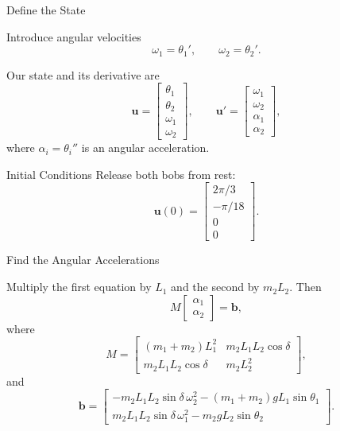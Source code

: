 \documentclass[10pt]{beamer}
\begin{document}
\begin{frame}{Define the State}

Introduce angular velocities
\[
\omega_1=\theta_1',
\qquad
\omega_2=\theta_2'.
\]

Our state and its derivative are
\[
\mathbf{u}=
\begin{bmatrix}
\theta_1\\
\theta_2\\
\omega_1\\
\omega_2
\end{bmatrix},
\qquad
\mathbf{u}'=
\begin{bmatrix}
\omega_1\\
\omega_2\\
\alpha_1\\
\alpha_2
\end{bmatrix},
\]
where $\alpha_i=\theta_i''$ is an angular acceleration.

\begin{block}{Initial Conditions}
Release both bobs from rest:
\[
\mathbf{u}(0)=
\begin{bmatrix}
2\pi/3\\
-\pi/18\\
0\\
0
\end{bmatrix}.
\]
\end{block}


\end{frame}

\begin{frame}{Find the Angular Accelerations}

Multiply the first equation by $L_1$ and the second by $m_2L_2$.
Then
\[
M
\begin{bmatrix}
\alpha_1\\
\alpha_2
\end{bmatrix}
=\mathbf{b},
\]
where
\[
M=
\begin{bmatrix}
(m_1+m_2)L_1^2 & m_2L_1L_2\cos\delta\\
m_2L_1L_2\cos\delta & m_2L_2^2
\end{bmatrix},
\]
and
\[
\mathbf{b}=
\begin{bmatrix}
-m_2L_1L_2\sin\delta\,\omega_2^2
-(m_1+m_2)gL_1\sin\theta_1\\[2mm]
m_2L_1L_2\sin\delta\,\omega_1^2
-m_2gL_2\sin\theta_2
\end{bmatrix}.
\]



\end{frame}
\end{document}
